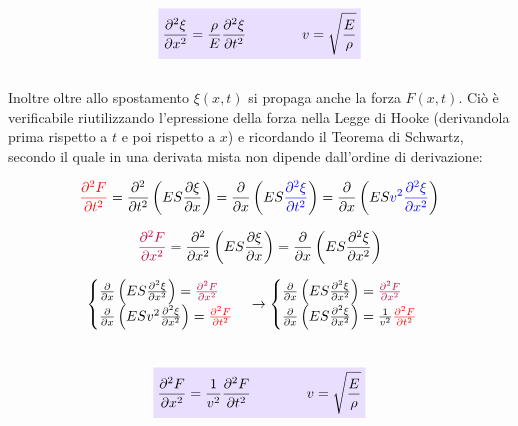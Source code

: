 \documentclass[x11names]{report}
\newcommand{\viola}[1]{\colorbox{yred}{$\displaystyle #1$}}
\begin{document}
	
	\begin{equation}
		\viola{\frac{\partial^2\xi}{\partial x^2} = \frac{\rho}{E} \frac{\partial^2 \xi}{\partial t^2} \qquad \qquad v = \sqrt{\frac{E}{\rho}}}
	\end{equation}
	\\
	
	\noindent
	Inoltre oltre allo spostamento \(\xi(x,t)\) si propaga anche la forza \(F(x,t)\). Ciò è verificabile riutilizzando l'epressione della forza nella Legge di Hooke (derivandola prima rispetto a \(t\) e poi rispetto a \(x\)) e ricordando il Teorema di Schwartz, secondo il quale in una derivata mista non dipende dall'ordine di derivazione:
	
	\[ 
	\textcolor{red}{\frac{\partial^2F}{\partial t^2}} = \frac{\partial^2}{\partial t^2} \left(ES\frac{\partial\xi}{\partial x}\right) = \frac{\partial}{\partial x} \left(ES\textcolor{blue}{\frac{\partial^2\xi}{\partial t^2}}\right) = \frac{\partial}{\partial x} \left(ES\textcolor{blue}{v^2\frac{\partial^2\xi}{\partial x^2}}\right) 
	\]
	
	\[ 
	\textcolor{purple}{\frac{\partial^2F}{\partial x^2}} = \frac{\partial^2}{\partial x^2} \left(ES\frac{\partial\xi}{\partial x}\right) = \frac{\partial}{\partial x} \left(ES\frac{\partial^2\xi}{\partial x^2}\right)
	\]
	
	\[ 
	\begin{cases}
		\frac{\partial}{\partial x} \left(ES\frac{\partial^2\xi}{\partial x^2}\right) = \textcolor{purple}{\frac{\partial^2F}{\partial x^2}} \\
		\frac{\partial}{\partial x} \left(ESv^2\frac{\partial^2\xi}{\partial x^2}\right)  =  \textcolor{red}{\frac{\partial^2F}{\partial t^2}}
	\end{cases} \to 
	\begin{cases}
		\frac{\partial}{\partial x} \left(ES\frac{\partial^2\xi}{\partial x^2}\right) = \textcolor{purple}{\frac{\partial^2F}{\partial x^2}} \\
		\frac{\partial}{\partial x} \left(ES\frac{\partial^2\xi}{\partial x^2}\right)  = \frac{1}{v^2} \textcolor{red}{\frac{\partial^2F}{\partial t^2}}
	\end{cases}
	\] \\
	
	
	\begin{equation}
		\viola{\frac{\partial^2F}{\partial x^2} = \frac{1}{v^2} \frac{\partial^2 F}{\partial t^2} \qquad \qquad v = \sqrt{\frac{E}{\rho}}}
	\end{equation}
	\\
	
\end{document}
